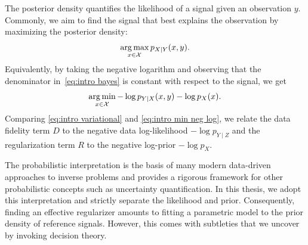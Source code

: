 The posterior density quantifies the likelihood of a signal given an observation \( y \).
Commonly, we aim to find the signal that best explains the observation by maximizing the posterior density:
\begin{equation}
	\operatorname*{arg\,max}_{x \in \mathcal{X}} p_{X \mid Y}(x, y).
	\label{eq:intro map}
\end{equation}
Equivalently, by taking the negative logarithm and observing that the denominator in~\cref{eq:intro bayes} is constant with respect to the signal, we get
\begin{equation}
	\operatorname*{arg\,min}_{x \in \mathcal{X}} - \log p_{Y\mid X}(x, y) - \log p_X(x).
	\label{eq:intro min neg log}
\end{equation}
Comparing \cref{eq:intro variational} and \cref{eq:intro min neg log}, we relate the data fidelity term \( D \) to the negative data log-likelihood \( - \log p_{Y \mid Z} \) and the regularization term \( R \) to the negative log-prior \( - \log p_X \).

The probabilistic interpretation is the basis of many modern data-driven approaches to inverse problems and provides a rigorous framework for other probabilistic concepts such as uncertainty quantification.
In this thesis, we adopt this interpretation and strictly separate the likelihood and prior.
Consequently, finding an effective regularizer amounts to fitting a parametric model to the prior density of reference signals.
However, this comes with subtleties that we uncover by invoking decision theory.

